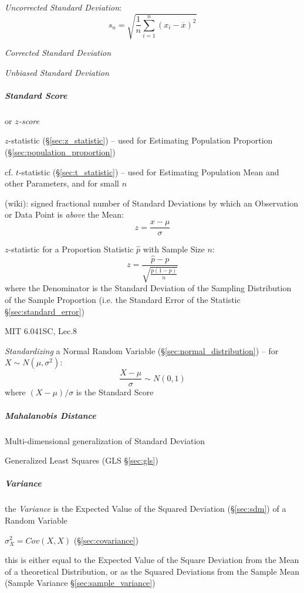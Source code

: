 \emph{Uncorrected Standard Deviation}:
\[
  s_n = \sqrt{\frac{1}{n}\sum_{i=1}^n (x_i - \overline{x})^2}
\]

\emph{Corrected Standard Deviation}

\emph{Unbiased Standard Deviation}



\subparagraph{Standard Score}\label{sec:standard_score}\hfill

or \emph{$z$-score}

$z$-statistic (\S\ref{sec:z_statistic}) -- used for Estimating Population
Proportion (\S\ref{sec:population_proportion})

cf. $t$-statistic (\S\ref{sec:t_statistic}) -- used for Estimating Population
Mean and other Parameters, and for small $n$

(wiki): signed fractional number of Standard Deviations by which an Observation
or Data Point is \emph{above} the Mean:
\[
  z = \frac{x - \mu}{\sigma}
\]

$z$-statistic for a Proportion Statistic $\hat{p}$ with Sample Size $n$:
\[
  z = \frac{\hat{p} - p}{\sqrt{\frac{p(1-p)}{n}}}
\]
where the Denominator is the Standard Deviation of the Sampling Distribution of
the Sample Proportion (i.e. the Standard Error of the Statistic
\S\ref{sec:standard_error})

MIT 6.041SC, Lec.8

\emph{Standardizing} a Normal Random Variable (\S\ref{sec:normal_distribution})
-- for $X \sim N(\mu, \sigma^2)$:
\[
  \frac{X - \mu}{\sigma} \sim N(0, 1)
\]
where $(X - \mu)/\sigma$ is the Standard Score



\subparagraph{Mahalanobis Distance}\label{sec:mahalanobis_distance}\hfill

Multi-dimensional generalization of Standard Deviation

Generalized Least Squares (GLS \S\ref{sec:gls})



\subparagraph{Variance}\label{sec:variance}\hfill

the \emph{Variance} is the Expected Value of the Squared Deviation
(\S\ref{sec:sdm}) of a Random Variable

$\sigma_X^2 = Cov(X,X)$ (\S\ref{sec:covariance})

this is either equal to the Expected Value of the Square Deviation from the
Mean of a theoretical Distribution, or as the Squared Deviations from the Sample
Mean (Sample Variance \S\ref{sec:sample_variance})

